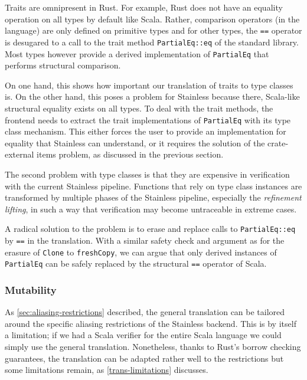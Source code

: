 Traits are omnipresent in Rust. For example, Rust does not have an
equality operation on all types by default like Scala. Rather,
comparison operators (in the language) are only defined on primitive
types and for other types, the \passthrough{\lstinline!==!} operator is
desugared to a call to the trait method
\passthrough{\lstinline!PartialEq::eq!} of the standard library. Most
types however provide a derived implementation of
\passthrough{\lstinline!PartialEq!} that performs structural comparison.

On one hand, this shows how important our translation of traits to type
classes is. On the other hand, this poses a problem for Stainless
because there, Scala-like structural equality exists on all types. To
deal with the trait methods, the frontend needs to extract the trait
implementations of \passthrough{\lstinline!PartialEq!} with its type
class mechanism. This either forces the user to provide an
implementation for equality that Stainless can understand, or it
requires the solution of the crate-external items problem, as discussed
in the previous section.

The second problem with type classes is that they are expensive in verification
with the current Stainless pipeline. Functions that rely on type class instances
are transformed by multiple phases of the Stainless pipeline, especially the
\emph{refinement lifting}, in such a way that verification may become
untraceable in extreme cases.

A radical solution to the problem is to erase and replace calls to
\passthrough{\lstinline!PartialEq::eq!} by \passthrough{\lstinline!==!}
in the translation. With a similar safety check and argument as for the
erasure of \passthrough{\lstinline!Clone!} to
\passthrough{\lstinline!freshCopy!}, we can argue that only derived
instances of \passthrough{\lstinline!PartialEq!} can be safely replaced
by the structural \passthrough{\lstinline!==!} operator of Scala.

\subsubsection{Mutability}

As \autoref{sec:aliasing-restrictions} described, the general translation can be
tailored around the specific aliasing restrictions of the Stainless backend.
This is by itself a limitation; if we had a Scala verifier for the entire Scala
language we could simply use the general translation. Nonetheless, thanks to
Rust's borrow checking guarantees, the translation can be adapted rather well to
the restrictions but some limitations remain, as \autoref{trans-limitations}
discusses.

